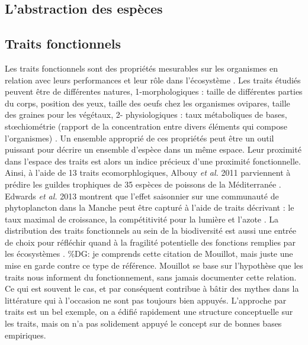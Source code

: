 \subsection{L'abstraction des
espèces}\label{labstraction-des-espuxe8ces}

\subsection*{Traits fonctionnels}\label{traits-fonctionnels}

Les traits fonctionnels sont des propriétés mesurables sur les
organismes en relation avec leurs performances et leur rôle dans
l'écosystème \cite{McGill2006}. Les traits étudiés peuvent être de
différentes natures, 1-morphologiques : taille de différentes parties du
corps, position des yeux, taille des oeufs chez les organismes ovipares,
taille des graines pour les végétaux, 2- physiologiques : taux
métaboliques de bases, stœchiométrie (rapport de la concentration entre
divers éléments qui compose l'organismes)
\cite{McGill2006,Albouy2011,Litchman2008}. Un ensemble approprié de ces
propriétés peut être un outil puissant pour décrire un ensemble d'espèce
dans un même espace. Leur proximité dans l'espace des traits est alors
un indice précieux d'une proximité fonctionnelle. Ainsi, à l'aide de 13
traits ecomorphlogiques, Albouy \textit{et al.} 2011 parviennent à
prédire les guildes trophiques de 35 espèces de poissons de la
Méditerranée \cite{Albouy2011}. Edwards \textit{et al.} 2013 montrent
que l'effet saisonnier sur une communauté de phytoplancton dans la
Manche peut être capturé à l'aide de traits décrivant : le taux maximal
de croissance, la compétitivité pour la lumière et l'azote
\cite{Edwards2013}. La distribution des traits fonctionnels au sein de
la biodiversité est aussi une entrée de choix pour réfléchir quand à la
fragilité potentielle des fonctions remplies par les écosystèmes
\cite{Mouillot2013}. \%DG: je comprends cette citation de Mouillot, mais
juste une mise en garde contre ce type de référence. Mouillot se base
sur l'hypothèse que les traits nous informent du fonctionnement, sans
jamais documenter cette relation. Ce qui est souvent le cas, et par
conséquent contribue à bâtir des mythes dans la littérature qui à
l'occasion ne sont pas toujours bien appuyés. L'approche par traits est
un bel exemple, on a édifié rapidement une structure conceptuelle sur
les traits, mais on n'a pas solidement appuyé le concept sur de bonnes
bases empiriques.

